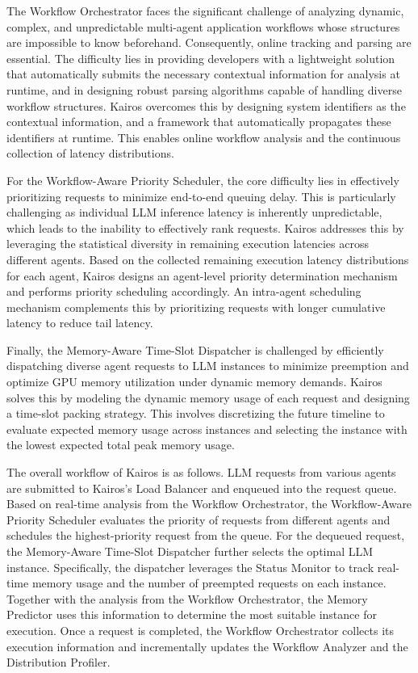 \documentclass[sigplan,nonacm]{acmart}
\newcommand{\system}{Kairos}
\begin{document}
The Workflow Orchestrator faces the significant challenge of analyzing dynamic, complex, and unpredictable multi-agent application workflows whose structures are impossible to know beforehand. Consequently, online tracking and parsing are essential. The difficulty lies in providing developers with a lightweight solution that automatically submits the necessary contextual information for analysis at runtime, and in designing robust parsing algorithms capable of handling diverse workflow structures. \system{} overcomes this by designing system identifiers as the contextual information, and a framework that automatically propagates these identifiers at runtime. This enables online workflow analysis and the continuous collection of latency distributions.

For the Workflow-Aware Priority Scheduler, the core difficulty lies in effectively prioritizing requests to minimize end-to-end queuing delay. This is particularly challenging as individual LLM inference latency is inherently unpredictable, which leads to the inability to effectively rank requests. \system{} addresses this by leveraging the statistical diversity in remaining execution latencies across different agents. Based on the collected remaining execution latency distributions for each agent, \system{} designs an agent-level priority determination mechanism and performs priority scheduling accordingly. An intra-agent scheduling mechanism complements this by prioritizing requests with longer cumulative latency to reduce tail latency.

Finally, the Memory-Aware Time-Slot Dispatcher is challenged by efficiently dispatching diverse agent requests to LLM instances to minimize preemption and optimize GPU memory utilization under dynamic memory demands. \system{} solves this by modeling the dynamic memory usage of each request and designing a time-slot packing strategy. This involves discretizing the future timeline to evaluate expected memory usage across instances and selecting the instance with the lowest expected total peak memory usage.

The overall workflow of \system{} is as follows.
 LLM requests from various agents are submitted to \system{}'s Load Balancer and enqueued into the request queue.
 Based on real-time analysis from the Workflow Orchestrator, the Workflow-Aware Priority Scheduler evaluates the priority of requests from different agents and schedules the highest-priority request from the queue.
 For the dequeued request, the Memory-Aware Time-Slot Dispatcher further selects the optimal LLM instance. Specifically, the dispatcher leverages the Status Monitor to track real-time memory usage and the number of preempted requests on each instance. Together with the analysis from the Workflow Orchestrator, the Memory Predictor uses this information to determine the most suitable instance for execution.
 Once a request is completed, the Workflow Orchestrator collects its execution information and incrementally updates the Workflow Analyzer and the Distribution Profiler.
\end{document}
